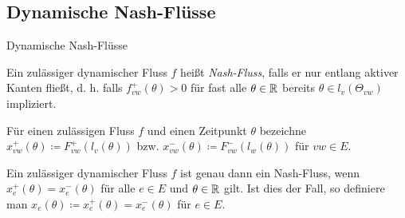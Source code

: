 \subsection{Dynamische Nash-Flüsse}

\begin{frame}{Dynamische Nash-Flüsse}
	\begin{definition}
		Ein zulässiger dynamischer Fluss $f$ heißt \emph{Nash-Fluss}, falls er nur entlang aktiver Kanten fließt, d. h. falls $f_{vw}^+(\theta) > 0$ für fast alle $\theta\in\mathbb{R}$ bereits $\theta\in l_v(\Theta_{vw})$ impliziert.
	\end{definition}
	\pause\begin{definition}
		Für einen zulässigen Fluss $f$ und einen Zeitpunkt $\theta$ bezeichne
		$x_{vw}^+(\theta)\coloneq  F_{vw}^+(l_v(\theta))$ bzw. $x_{vw}^-(\theta)\coloneq  F^-_{vw}(l_w(\theta))$ für $vw\in E$.
	\end{definition}
	\pause\begin{theorem}
	Ein zulässiger dynamischer Fluss $f$ ist genau dann ein Nash-Fluss,
	wenn $x_e^+(\theta) = x_e^-(\theta)$ für alle $e\in E$ und $\theta\in\mathbb{R}$ gilt.
	Ist dies der Fall, so definiere man $x_e(\theta)\coloneq x_e^+(\theta) = x_e^-(\theta)$ für $e\in E$.
	\end{theorem}
\end{frame}
